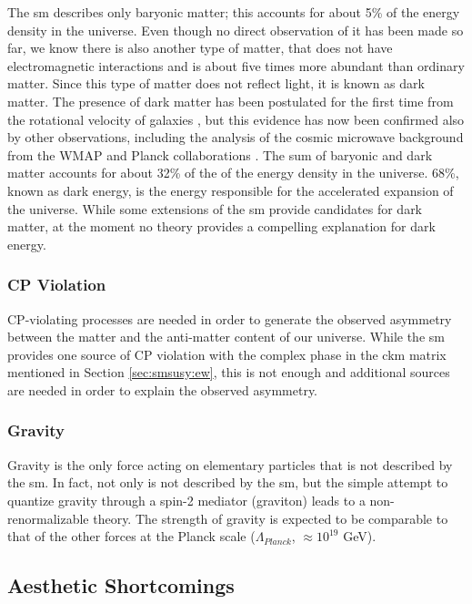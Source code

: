 The \gls{sm} describes only baryonic matter; this accounts for about 5\% of the energy density in the universe. Even though no direct observation of it has been made so far, we know there is also another type of matter, that does not have electromagnetic interactions and  is about five times more abundant than ordinary matter.  Since this type of matter does not reflect light, it is known as dark matter. The presence of dark matter has been postulated for the first time from the rotational velocity of galaxies \cite{Zwicky:1937zza}, but this evidence has now been confirmed also by other observations, including the analysis of the cosmic microwave background from the WMAP and Planck collaborations \cite{Larson:2010gs,Ade:2013zuv}. The sum of baryonic and dark matter accounts for about 32\% of the of the energy density in the universe. 68\%, known as dark energy, is the energy responsible for the accelerated expansion of the universe. While some extensions of the \gls{sm} provide candidates for dark matter, at the moment no theory provides a compelling explanation for dark energy.


\subsubsection*{CP Violation}

CP-violating processes are needed in order to generate the observed asymmetry between the matter and the anti-matter content of our universe. While the \gls{sm} provides one source of CP violation with the complex phase in the \gls{ckm} matrix mentioned in Section \ref{sec:smsusy:ew}, this is not enough and additional sources are needed in order to explain the observed asymmetry.

\subsubsection*{Gravity}

Gravity is the only force acting on elementary particles that is not described by the \gls{sm}. In fact, not only is not described by the \gls{sm}, but the simple attempt to quantize gravity through a spin-2  mediator (graviton) leads to a non-renormalizable theory. The strength of gravity is expected to be comparable to that of the other forces at the Planck scale ($\Lambda_{Planck}$, $\approx 10^{19}$ GeV). 

\subsection{Aesthetic Shortcomings}
\label{sec:sm:aesthetics}

